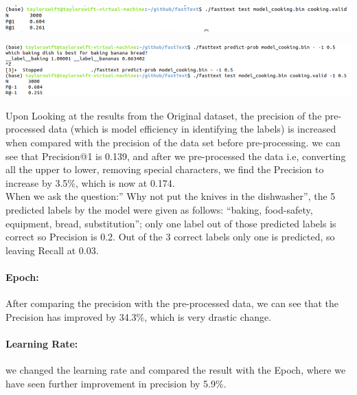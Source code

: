 \documentclass[a4paper,1pt]{article}
\begin{document}
\begin{center}
	\begin{minipage}{\linewidth}
		\centering
		\includegraphics[width=1.0\linewidth]{"Precision and Recall at position 16"}
	\end{minipage}
\end{center}


\begin{center}
	\begin{minipage}{\linewidth}
		\centering
		\includegraphics[width=1.0\linewidth]{"Precision and Recall at position 17"}
	\end{minipage}
\end{center}


\noindent Upon Looking at the results from the Original dataset, the precision of the pre-processed data (which is model efficiency in identifying the labels) is increased when compared with the precision of the data set before pre-processing.  we can see that Precision@1 is 0.139, and after we pre-processed the data i.e, converting all the upper to lower, removing special characters, we find the Precision to increase by 3.5\%, which is now at 0.174.\\

\noindent When we ask the question:” Why not put the knives in the dishwasher”, the 5 predicted labels by the model were given as follows: “baking, food-safety, equipment, bread, substitution”; only one label out of those predicted labels is correct so Precision is 0.2. Out of the 3 correct labels only one is predicted, so leaving Recall at 0.03.

\paragraph{Epoch:}{After comparing the precision with the pre-processed data, we can see that the Precision has improved by 34.3\%, which is very drastic change.}

\paragraph{Learning Rate:}{we changed the learning rate and compared the result with the Epoch, where we have seen further improvement in precision by 5.9\%.}
\end{document}
